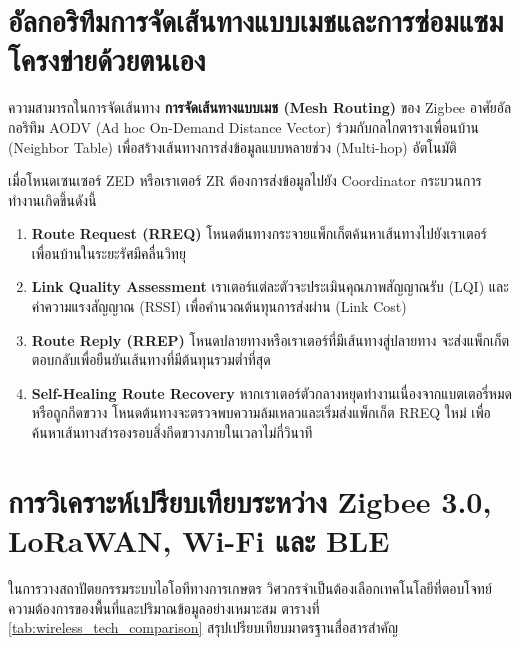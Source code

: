 \section{อัลกอริทึมการจัดเส้นทางแบบเมชและการซ่อมแซมโครงข่ายด้วยตนเอง}

ความสามารถในการจัดเส้นทาง \textbf{การจัดเส้นทางแบบเมช (Mesh Routing)} ของ Zigbee อาศัยอัลกอริทึม AODV (Ad hoc On-Demand Distance Vector) ร่วมกับกลไกตารางเพื่อนบ้าน (Neighbor Table) เพื่อสร้างเส้นทางการส่งข้อมูลแบบหลายช่วง (Multi-hop) อัตโนมัติ

\begin{agribox}
เมื่อโหนดเซนเซอร์ ZED หรือเราเตอร์ ZR ต้องการส่งข้อมูลไปยัง Coordinator กระบวนการทำงานเกิดขึ้นดังนี้
\begin{enumerate}
    \item \textbf{Route Request (RREQ)} โหนดต้นทางกระจายแพ็กเก็ตค้นหาเส้นทางไปยังเราเตอร์เพื่อนบ้านในระยะรัศมีคลื่นวิทยุ
    \item \textbf{Link Quality Assessment} เราเตอร์แต่ละตัวจะประเมินคุณภาพสัญญาณรับ (LQI) และค่าความแรงสัญญาณ (RSSI) เพื่อคำนวณต้นทุนการส่งผ่าน (Link Cost)
    \item \textbf{Route Reply (RREP)} โหนดปลายทางหรือเราเตอร์ที่มีเส้นทางสู่ปลายทาง จะส่งแพ็กเก็ตตอบกลับเพื่อยืนยันเส้นทางที่มีต้นทุนรวมต่ำที่สุด
    \item \textbf{Self-Healing Route Recovery} หากเราเตอร์ตัวกลางหยุดทำงานเนื่องจากแบตเตอรี่หมดหรือถูกกีดขวาง โหนดต้นทางจะตรวจพบความล้มเหลวและเริ่มส่งแพ็กเก็ต RREQ ใหม่ เพื่อค้นหาเส้นทางสำรองรอบสิ่งกีดขวางภายในเวลาไม่กี่วินาที
\end{enumerate}
\end{agribox}

\section{การวิเคราะห์เปรียบเทียบระหว่าง Zigbee 3.0, LoRaWAN, Wi-Fi และ BLE}

ในการวางสถาปัตยกรรมระบบไอโอทีทางการเกษตร วิศวกรจำเป็นต้องเลือกเทคโนโลยีที่ตอบโจทย์ความต้องการของพื้นที่และปริมาณข้อมูลอย่างเหมาะสม ตารางที่ \ref{tab:wireless_tech_comparison} สรุปเปรียบเทียบมาตรฐานสื่อสารสำคัญ

